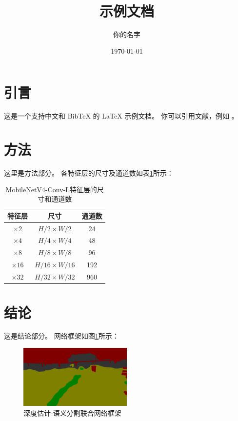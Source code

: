 \documentclass{article}
\begin{document}
\title{示例文档}
\author{你的名字}
\date{\today}
\maketitle

\section{引言}
这是一个支持中文和 BibTeX 的 LaTeX 示例文档。 你可以引用文献，例如 \cite{zhao2024autonomous}。

\section{方法}
这里是方法部分。
各特征层的尺寸及通道数如表\ref{tab:feature_map_sizes}所示：

\begin{table}[hbt]
    \centering
    \caption{MobileNetV4-Conv-L特征层的尺寸和通道数} 
    \label{tab:feature_map_sizes}
    \begin{tabular*}{0.75\textwidth}{@{\extracolsep{\fill}}ccc}
    \toprule
      特征层 & 尺寸 & 通道数 \\
    \midrule
      \(\times2\)  & \(H/2 \times W/2\)   & 24 \\
      \(\times4\)  & \(H/4 \times W/4\)   & 48 \\
      \(\times8\)  & \(H/8 \times W/8\)   & 96 \\
      \(\times16\) & \(H/16 \times W/16\) & 192 \\
      \(\times32\) & \(H/32 \times W/32\) & 960 \\
    \bottomrule
    \end{tabular*}
  \end{table}

\section{结论}
这是结论部分。
网络框架如图\ref{fig:basenetwork}所示：
\begin{figure}[hbt]
    \centering
    \includegraphics[width=0.5\textwidth]{figures/seg.png}
    \caption{深度估计-语义分割联合网络框架}\label{fig:basenetwork}
   \end{figure}


\end{document}
